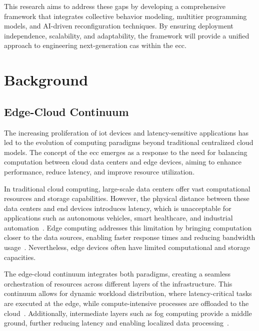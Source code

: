 \documentclass[runningheads]{llncs}
\begin{document}
This research aims to address these gaps by developing a comprehensive framework that integrates collective behavior modeling,
multitier programming models,
and AI-driven reconfiguration techniques.
%
By ensuring deployment independence,
scalability,
and adaptability,
the framework will provide a unified approach to engineering next-generation \ac{cas} within the \ac{ecc}.

\section{Background}
\label{sec:background}

\subsection{Edge-Cloud Continuum}
\label{sec:ecc}

The increasing proliferation of \ac{iot} devices and latency-sensitive applications has led to the evolution of computing paradigms beyond traditional centralized cloud models.
%
The concept of the \ac{ecc} emerges as a response to the need for balancing computation between cloud data centers and edge devices,
aiming to enhance performance,
reduce latency,
and improve resource utilization.

In traditional cloud computing,
large-scale data centers offer vast computational resources and storage capabilities.
%
However,
the physical distance between these data centers and end devices introduces latency,
which is unacceptable for applications such as autonomous vehicles,
smart healthcare,
and industrial automation~\cite{DBLP:journals/iotj/ShiCZLX16}.
%
Edge computing addresses this limitation by bringing computation closer to the data sources,
enabling faster response times and reducing bandwidth usage~\cite{DBLP:journals/computer/Satyanarayanan17}.
%
Nevertheless,
edge devices often have limited computational and storage capacities.

The edge-cloud continuum integrates both paradigms,
creating a seamless orchestration of resources across different layers of the infrastructure.
%
This continuum allows for dynamic workload distribution,
where latency-critical tasks are executed at the edge,
while compute-intensive processes are offloaded to the cloud~\cite{DBLP:series/sci/BonomiMNZ14}.
%
Additionally,
intermediate layers such as fog computing provide a middle ground,
further reducing latency and enabling localized data processing~\cite{DBLP:journals/ccr/GonzalezR14}.
\end{document}
